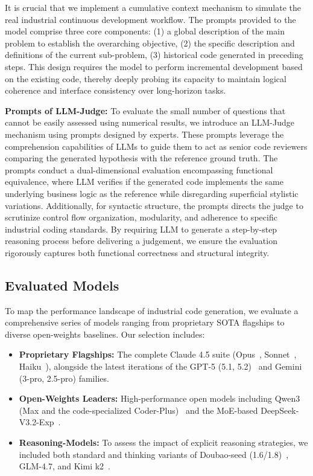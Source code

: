 \documentclass{article}
\theoremstyle{plain}
\theoremstyle{definition}
\theoremstyle{remark}
\begin{document}
It is crucial that we implement a cumulative context mechanism to simulate the real industrial continuous development workflow. The prompts provided to the model comprise three core components: (1) a global description of the main problem to establish the overarching objective, (2) the specific description and definitions of the current sub-problem, (3) historical code generated in preceding steps. This design requires the model to perform incremental development based on the existing code, thereby deeply probing its capacity to maintain logical coherence and interface consistency over long-horizon tasks.

\textbf{Prompts of LLM-Judge:} To evaluate the small number of questions that cannot be easily assessed using numerical results, we introduce an LLM-Judge mechanism using prompts designed by experts. These prompts leverage the comprehension capabilities of LLMs to guide them to act as senior code reviewers comparing the generated hypothesis with the reference ground truth. The prompts conduct a dual-dimensional evaluation encompassing functional equivalence, where LLM verifies if the generated code implements the same underlying business logic as the reference while disregarding superficial stylistic variations. Additionally, for syntactic structure, the prompts directs the judge to scrutinize control flow organization, modularity, and adherence to specific industrial coding standards. By requiring LLM to generate a step-by-step reasoning process before delivering a judgement, we ensure the evaluation rigorously captures both functional correctness and structural integrity.


\subsection{Evaluated Models}
To map the performance landscape of industrial code generation, we evaluate a comprehensive series of models ranging from proprietary SOTA flagships to diverse open-weights baselines. Our selection includes:
\begin{itemize}
    \vspace{-0.2cm}
    \item  \textbf{Proprietary Flagships:} The complete Claude 4.5 suite (Opus~\cite{claude45opus}, Sonnet~\cite{claude45sonnet}, Haiku~\cite{claude45haiku}), alongside the latest iterations of the GPT-5 (5.1, 5.2)~\cite{openaigpt52025} and Gemini (3-pro, 2.5-pro) families.
    \vspace{-0.2cm}
    \item \textbf{Open-Weights Leaders:} High-performance open models including Qwen3 (Max and the code-specialized Coder-Plus)~\cite{yang2025qwen3} and the MoE-based DeepSeek-V3.2-Exp~\cite{liu2025deepseek}.
    \vspace{-0.2cm}
    \item \textbf{Reasoning-Models:} To assess the impact of explicit reasoning strategies, we included both standard and thinking variants of Doubao-seed (1.6/1.8)~\cite{seedseed1}, GLM-4.7, and Kimi k2~\cite{team2025kimi}.
    \vspace{-0.2cm}
\end{itemize}
\end{document}
